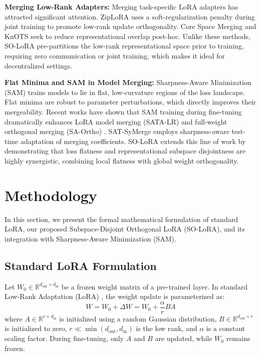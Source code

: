 \documentclass{article}
\theoremstyle{plain}
\theoremstyle{definition}
\theoremstyle{remark}
\begin{document}
\textbf{Merging Low-Rank Adapters:} Merging task-specific LoRA adapters has attracted significant attention. ZipLoRA \cite{po2023orthogonal} uses a soft-regularization penalty during joint training to promote low-rank update orthogonality. Core Space Merging \cite{po2023orthogonal} and KnOTS seek to reduce representational overlap post-hoc. Unlike these methods, SO-LoRA pre-partitions the low-rank representational space prior to training, requiring zero communication or joint training, which makes it ideal for decentralized settings.

\textbf{Flat Minima and SAM in Model Merging:} Sharpness-Aware Minimization (SAM) \cite{foret2021sam} trains models to lie in flat, low-curvature regions of the loss landscape. Flat minima are robust to parameter perturbations, which directly improves their mergeability. Recent works have shown that SAM training during fine-tuning dramatically enhances LoRA model merging (SATA-LR) \cite{satalr2026flatter} and full-weight orthogonal merging (SA-Ortho) \cite{saortho2026saortho}. SAT-SyMerge \cite{symerge2025steering} employs sharpness-aware test-time adaptation of merging coefficients. SO-LoRA extends this line of work by demonstrating that loss flatness and representational subspace disjointness are highly synergistic, combining local flatness with global weight orthogonality.

\section{Methodology}
\label{method}

In this section, we present the formal mathematical formulation of standard LoRA, our proposed Subspace-Disjoint Orthogonal LoRA (SO-LoRA), and its integration with Sharpness-Aware Minimization (SAM).

\subsection{Standard LoRA Formulation}

Let $W_0 \in \mathbb{R}^{d_{\text{out}} \times d_{\text{in}}}$ be a frozen weight matrix of a pre-trained layer. In standard Low-Rank Adaptation (LoRA) \cite{hu2021lora}, the weight update is parameterized as:
\begin{equation}
  W = W_0 + \Delta W = W_0 + \frac{\alpha}{r} B A
\end{equation}
where $A \in \mathbb{R}^{r \times d_{\text{in}}}$ is initialized using a random Gaussian distribution, $B \in \mathbb{R}^{d_{\text{out}} \times r}$ is initialized to zero, $r \ll \min(d_{\text{out}}, d_{\text{in}})$ is the low rank, and $\alpha$ is a constant scaling factor. During fine-tuning, only $A$ and $B$ are updated, while $W_0$ remains frozen.
\end{document}
